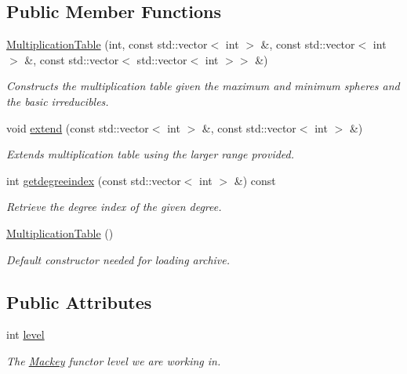 \subsection*{Public Member Functions}
\begin{DoxyCompactItemize}
\item 
\hyperlink{classMackey_1_1MultiplicationTable_a8530e27d8d2c3c755eb5041a2ee8c35b}{Multiplication\+Table} (int, const std\+::vector$<$ int $>$ \&, const std\+::vector$<$ int $>$ \&, const std\+::vector$<$ std\+::vector$<$ int $>$$>$ \&)
\begin{DoxyCompactList}\small\item\em Constructs the multiplication table given the maximum and minimum spheres and the basic irreducibles. \end{DoxyCompactList}\item 
void \hyperlink{classMackey_1_1MultiplicationTable_a4371e6ba8a058073c005e636979b7230}{extend} (const std\+::vector$<$ int $>$ \&, const std\+::vector$<$ int $>$ \&)
\begin{DoxyCompactList}\small\item\em Extends multiplication table using the larger range provided. \end{DoxyCompactList}\item 
int \hyperlink{classMackey_1_1MultiplicationTable_ac15f13c4a9d160226582e1970ef4b00c}{getdegreeindex} (const std\+::vector$<$ int $>$ \&) const
\begin{DoxyCompactList}\small\item\em Retrieve the degree index of the given degree. \end{DoxyCompactList}\item 
\hyperlink{classMackey_1_1MultiplicationTable_ac3bc2d09599a994b2b159def52484bae}{Multiplication\+Table} ()
\begin{DoxyCompactList}\small\item\em Default constructor needed for loading archive. \end{DoxyCompactList}\end{DoxyCompactItemize}
\subsection*{Public Attributes}
\begin{DoxyCompactItemize}
\item 
int \hyperlink{classMackey_1_1MultiplicationTable_ad5a05c126e0b3c769fa9b1196a8db96a}{level}
\begin{DoxyCompactList}\small\item\em The \hyperlink{namespaceMackey}{Mackey} functor level we are working in. \end{DoxyCompactList}\end{DoxyCompactItemize}
